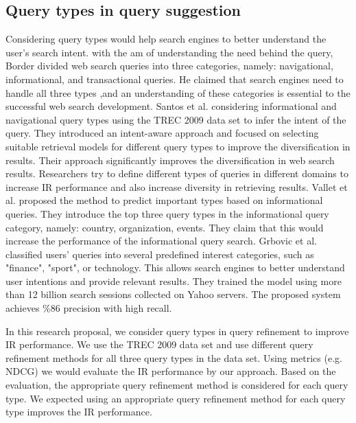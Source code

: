 \documentclass[sigconf]{acmart}
\begin{document}
\subsection{Query types in query suggestion}
Considering query types would help search engines to better understand the user’s search intent. with the am of understanding the need behind the query,  Border \cite{broder2002taxonomy} divided web search queries into three categories, namely: navigational, informational, and transactional queries. He claimed that search engines need to handle all three types ,and an understanding of these categories is essential to the successful web search development. Santos et al. \cite{santos2011intent} considering informational and navigational query types using the TREC 2009 data set \cite{clarke2009overview} to infer the intent of the query. They introduced an intent-aware approach and focused on selecting suitable retrieval models for different query types to improve the diversification in results. Their approach significantly improves the diversification in web search results. Researchers try to define different types of queries in different domains to increase IR performance and also increase diversity in retrieving results. Vallet et al. \cite{vallet2008inferring} proposed the method to predict important types based on informational queries. They introduce the top three query types in the informational query category, namely: country, organization, events. They claim that this would increase the performance of the informational query search. Grbovic et al. \cite{grbovic2015querycategorizr} classified users' queries into several predefined interest categories, such as "finance", "sport", or technology. This allows search engines to better understand user intentions and provide relevant results. They trained the model using more than 12 billion search sessions collected on Yahoo servers. The proposed system achieves \%86 precision with high recall.

In this research proposal, we consider query types in query refinement to improve IR performance. We use the TREC 2009 data set \cite{clarke2009overview} and use different query refinement methods for all three query types in the data set. Using metrics (e.g. NDCG) we would evaluate the IR performance by our approach. Based on the evaluation, the appropriate query refinement method is considered for each query type. We expected using an appropriate query refinement method for each query type improves the IR performance.


 
\end{document}
